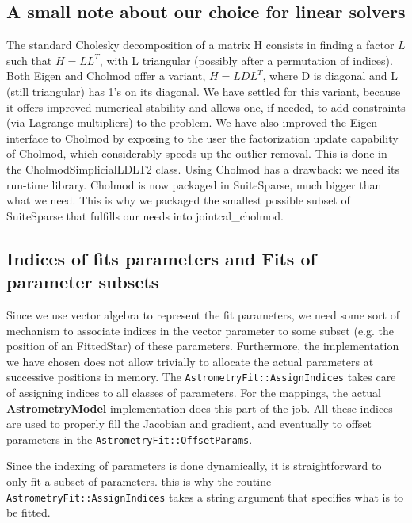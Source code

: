 \documentclass[a4paper,12pt]{scrartcl}
\newcommand{\ClName}[1]{{\bf #1}}
\newcommand{\RoutineName}[1]{\texttt{#1}}
\def\bf{\normalfont\bfseries}
\begin{document}
\subsection{A small note about our choice for linear solvers}
The standard Cholesky decomposition of a matrix H consists in finding
a factor $L$ such that $H = LL^T$, with L triangular (possibly after a
permutation of indices). Both Eigen and Cholmod offer a variant, $H = LDL^T$, 
where D is diagonal and L (still triangular) has 1's on its diagonal. We
have settled for this variant, because it offers improved numerical stability
and allows one, if needed, to add constraints (via Lagrange multipliers)
to the problem. We have also improved the Eigen interface to
Cholmod by exposing to the user the factorization update capability
of Cholmod, which considerably speeds up the outlier removal.
This is done in the CholmodSimplicialLDLT2 class. Using Cholmod has 
a drawback: we need its run-time library. Cholmod is now packaged 
in SuiteSparse, much bigger than what we need. This is why we packaged
the smallest possible subset of SuiteSparse that fulfills our needs 
into jointcal\_cholmod.




\subsection{Indices of fits parameters and Fits of parameter subsets \label{sec:indices_whattofit}}
Since we use vector algebra to represent the fit parameters, we need
some sort of mechanism to associate indices in the vector parameter to
some subset (e.g. the position of an FittedStar) of these parameters.
Furthermore, the implementation we have chosen does not allow
trivially to allocate the actual parameters at successive positions in
memory. The \RoutineName{AstrometryFit::AssignIndices} takes care of
assigning indices to all classes of parameters. For the mappings, the
actual \ClName{AstrometryModel} implementation does this part of the
job. All these indices are used to properly fill the Jacobian and
gradient, and eventually to offset parameters in the
\RoutineName{AstrometryFit::OffsetParams}.

Since the indexing of parameters is done dynamically, it is
straightforward to only fit a subset of parameters. this is why the routine
\RoutineName{AstrometryFit::AssignIndices} takes a string argument that specifies
what is to be fitted.
\end{document}
